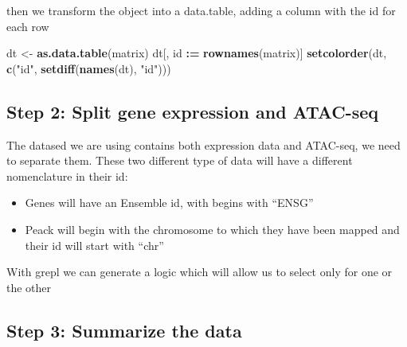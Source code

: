 \documentclass[]{article}
\newenvironment{Shaded}{\begin{snugshade}}{\end{snugshade}}
\newcommand{\ErrorTok}[1]{\textcolor[rgb]{0.64,0.00,0.00}{\textbf{#1}}}
\newcommand{\KeywordTok}[1]{\textcolor[rgb]{0.13,0.29,0.53}{\textbf{#1}}}
\newcommand{\NormalTok}[1]{#1}
\newcommand{\OperatorTok}[1]{\textcolor[rgb]{0.81,0.36,0.00}{\textbf{#1}}}
\newcommand{\StringTok}[1]{\textcolor[rgb]{0.31,0.60,0.02}{#1}}
\providecommand{\tightlist}{%
  \setlength{\itemsep}{0pt}\setlength{\parskip}{0pt}}
\begin{document}
then we transform the object into a data.table, adding a column with the
id for each row

\begin{Shaded}
\begin{Highlighting}[]
\NormalTok{dt <-}\StringTok{ }\KeywordTok{as.data.table}\NormalTok{(matrix)}
\NormalTok{dt[, id }\OperatorTok{:}\ErrorTok{=}\StringTok{ }\KeywordTok{rownames}\NormalTok{(matrix)]}
\KeywordTok{setcolorder}\NormalTok{(dt, }\KeywordTok{c}\NormalTok{(}\StringTok{"id"}\NormalTok{, }\KeywordTok{setdiff}\NormalTok{(}\KeywordTok{names}\NormalTok{(dt), }\StringTok{"id"}\NormalTok{)))}
\end{Highlighting}
\end{Shaded}

\hypertarget{step-2-split-gene-expression-and-atac-seq}{%
\subsection{Step 2: Split gene expression and
ATAC-seq}\label{step-2-split-gene-expression-and-atac-seq}}

The datased we are using contains both expression data and ATAC-seq, we
need to separate them. These two different type of data will have a
different nomenclature in their id:

\begin{itemize}
\tightlist
\item
  Genes will have an Ensemble id, with begins with ``ENSG''
\item
  Peack will begin with the chromosome to which they have been mapped
  and their id will start with ``chr''
\end{itemize}

With grepl we can generate a logic which will allow us to select only
for one or the other

\begin{Shaded}
\end{Shaded}

\hypertarget{step-3-summarize-the-data}{%
\subsection{Step 3: Summarize the
data}\label{step-3-summarize-the-data}}
\end{document}
